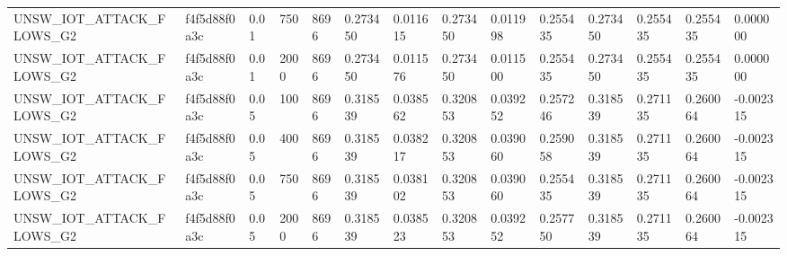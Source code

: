 \begin{tabular}{llllllllllllll}
UNSW\_IOT\_ATTACK\_FLOWS\_G2 & f4f5d88f0a3c & 0.01 & 750 & 8696 & 0.273450 & 0.011615 & 0.273450 & 0.011998 & 0.255435 & 0.273450 & 0.255435 & 0.255435 & 0.000000 \\
UNSW\_IOT\_ATTACK\_FLOWS\_G2 & f4f5d88f0a3c & 0.01 & 2000 & 8696 & 0.273450 & 0.011576 & 0.273450 & 0.011500 & 0.255435 & 0.273450 & 0.255435 & 0.255435 & 0.000000 \\
UNSW\_IOT\_ATTACK\_FLOWS\_G2 & f4f5d88f0a3c & 0.05 & 100 & 8696 & 0.318539 & 0.038562 & 0.320853 & 0.039252 & 0.257246 & 0.318539 & 0.271135 & 0.260064 & -0.002315 \\
UNSW\_IOT\_ATTACK\_FLOWS\_G2 & f4f5d88f0a3c & 0.05 & 400 & 8696 & 0.318539 & 0.038217 & 0.320853 & 0.039060 & 0.259058 & 0.318539 & 0.271135 & 0.260064 & -0.002315 \\
UNSW\_IOT\_ATTACK\_FLOWS\_G2 & f4f5d88f0a3c & 0.05 & 750 & 8696 & 0.318539 & 0.038102 & 0.320853 & 0.039060 & 0.255435 & 0.318539 & 0.271135 & 0.260064 & -0.002315 \\
UNSW\_IOT\_ATTACK\_FLOWS\_G2 & f4f5d88f0a3c & 0.05 & 2000 & 8696 & 0.318539 & 0.038523 & 0.320853 & 0.039252 & 0.257750 & 0.318539 & 0.271135 & 0.260064 & -0.002315 \\
\bottomrule
\end{tabular}
